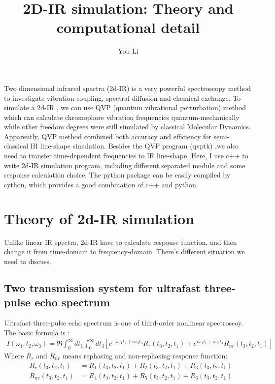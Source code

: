 \documentclass[12pt,a4paper,scale=1.0]{article}
\author{You Li}
\title{2D-IR simulation: Theory and computational detail}
\begin{document}
	\maketitle   %
	\makeatletter
	\newcommand{\rmnum}[1]{\romannumeral #1}
	\newcommand{\Rmnum}[1]{\expandafter\@slowromancap\romannumeral #1@}
	\makeatother %
	
	Two dimensional infrared spectra (2d-IR) is a very powerful spectroscopy method to investigate vibration coupling, spectral diffusion and chemical exchange. To simulate a 2d-IR , we can use QVP (quantum vibrational perturbation) method which can calculate chromophore vibration frequencies quantum-mechanically while other freedom degrees were still simulated by classical Molecular Dynamics. Apparently, QVP method combined both accuracy and efficiency for semi-classical IR line-shape simulation. Besides the QVP program (qvptk) ,we also need to transfer time-dependent frequencies to IR line-shape.  
	Here, I use c++ to write  2d-IR simulation program, including different separated module and some response calculation choice. The python package can be easily compiled by cython, which provides a good combination of c++ and python. 
	
	
	\section{ Theory of 2d-IR simulation }
	 Unlike linear IR spectra, 2d-IR have to calculate response function, and then change it from time-domain to frequency-domain. There's different situation we need to discuss.
	 
	 \subsection{ Two transmission system for ultrafast three-pulse echo spectrum} \label{sec 1-1 }
	 
	 Ultrafast three-pulse echo spectrum is one of third-order nonlinear spectroscoy. The basic formula is \cite{paesani2009infrared}: 
	 \begin{equation} \label{equ:1-1} 
	 \begin{aligned} 
	 I( \omega _1, t_2, \omega _3) = \Re \int_{0}^{\infty} dt_1 \int_{0}^{\infty} dt_3 
	 [ e^{-i\omega_1 t_1 + i\omega_3 t_3  } R_r(t_3,t_2,t_1) + 
	 e^{i\omega_1 t_1 +i\omega_3  t_3  } R_{nr}(t_3,t_2,t_1)  ] 
	 \end{aligned}
	 \end{equation}
	 Where $R_r$ and $R_{nr}$ means rephasing and non-rephasing response function:
	  \begin{equation}  \label{equ:basic}
	  \begin{aligned}
	  & R_r(t_3,t_2,t_1) & = R_1(t_3,t_2,t_1)  + R_2(t_3,t_2,t_1) + R_3(t_3,t_2,t_1) \\
	  & R_{nr}(t_3,t_2,t_1) & = R_4(t_3,t_2,t_1)  + R_5(t_3,t_2,t_1) + R_6(t_3,t_2,t_1)
	  \end{aligned}
	  \end{equation}
	  
\end{document}
